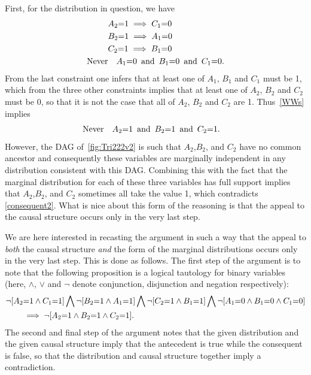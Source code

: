 {First, for the distribution in question, we have
\begin{align} 
\begin{split}\label{WWs}
&A_2 \mathord{=} 1 \implies C_1\mathord{=} 0\\
&B_2\mathord{=} 1 \implies A_1\mathord{=} 0\\
&C_2 \mathord{=} 1 \implies B_1 \mathord{=} 0\\
\text{Never}  &\quad A_1 \mathord{=} 0\,\text{ and }\, B_1 \mathord{=} 0\,\text{ and }\, C_1 \mathord{=} 0.
\end{split}
\end{align}
From the last constraint one infers that at least one of $A_1$, $B_1$ and $C_1$ must be 1, which from the three other constraints implies that at least one of $A_2$, $B_2$ and $C_2$ must be 0, so that it is not the case that all of $A_2$, $B_2$ and $C_2$ are 1.  Thus~\cref{WWs} implies
\begin{align} \label{consequent2}
\text{Never}  \quad &A_2 \mathord{=} 1\,\text{ and }\, B_2 \mathord{=} 1\,\text{ and }\, C_2 \mathord{=} 1.
\end{align}
However, the DAG of~\cref{fig:Tri222v2} is such that $A_2$,$B_2$, and $C_2$ have no common ancestor and consequently these variables are marginally independent in any distribution consistent with this DAG.  Combining this with the fact that the marginal distribution for each of these three variables has full support implies that $A_2$,$B_2$, and $C_2$ sometimes all take the value 1, which contradicts \cref{consequent2}.  What is nice about this form of the reasoning is that the appeal to the causal structure occurs only in the very last step.  

We are here interested in recasting the argument in such a way that the appeal to {\em both} the causal structure {\em and} the form of the marginal distributions occurs only in the very last step.  This is done as follows.  The first step of the argument is to note that the following proposition is a logical tautology for binary variables (here, $\land$, $\lor$ and $\lnot$ denote conjunction, disjunction and negation respectively):
\begin{align}\begin{split}\label{tautology1}
&\lnot [A_2 \mathord{=} 1 \land C_1 \mathord{=} 1] \bigwedge \lnot [B_2 \mathord{=} 1 \land A_1 \mathord{=} 1] \bigwedge \lnot [C_2 \mathord{=} 1 \land B_1 \mathord{=} 1] \bigwedge \lnot [A_1 \mathord{=} 0 \land B_1 \mathord{=} 0 \land C_1 \mathord{=} 0]\\
 &\qquad\implies
\lnot [A_2 \mathord{=} 1 \land B_2 \mathord{=} 1 \land C_2 \mathord{=} 1].
\end{split}\end{align}
The second and final step of the argument notes that the given distribution and the given causal structure imply that the antecedent is true while the consequent is false, so that the distribution and causal structure together imply a contradiction.

}
